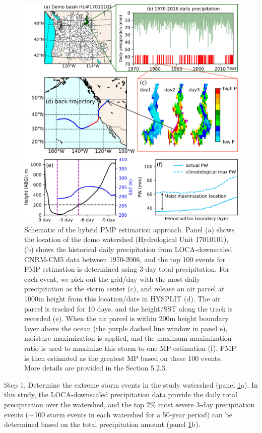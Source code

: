 \begin{figure}[htbp]
	\includegraphics[width=15cm]{pics/ch5/fig2.jpg}
	\caption{Schematic of the hybrid PMP estimation approach. Panel (a) shows the location of the demo watershed (Hydrological Unit 17010101), (b) shows the historical daily precipitation from LOCA-downscaled CNRM-CM5 data between 1970-2006, and the top 100 events for PMP estimation is determined using 3-day total precipitation. For each event, we pick out the grid/day with the most daily precipitation as the storm center (c), and release an air parcel at 1000m height from this location/date in HYSPLIT (d). The air parcel is tracked for 10 days, and the height/SST along the track is recorded (e). When the air parcel is within 200m height boundary layer above the ocean (the purple dashed line window in panel e), moisture maximization is applied, and the maximum maximization ratio is used to maximize this storm to one MP estimation (f). PMP is then estimated as the greatest MP based on these 100 events. More details are provided in the Section 5.2.3.}
	\label{fig:5-2}
\end{figure}

Step 1. Determine the extreme storm events in the study watershed (panel \ref{fig:5-2}a). In this study, the LOCA-downscaled precipitation data provide the daily total precipitation over the watershed, and the top 2\% most severe 3-day precipitation events ($\scriptsize{\sim}$100 storm events in each watershed for a 50-year period) can be determined based on the total precipitation amount (panel \ref{fig:5-2}b).

